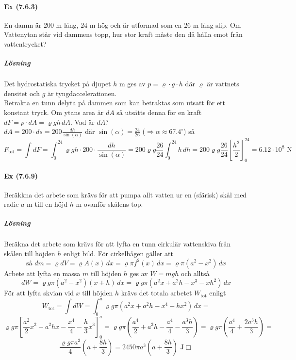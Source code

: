 \paragraph*{Ex (7.6.3)} En damm är $200$ m lång, $24$ m hög och är utformad som en $26$ m lång slip.
Om Vattenytan står vid dammens topp, hur stor kraft måste den då hålla emot från vattentrycket?
\subparagraph{Lösning}
Det hydrostatiska trycket på djupet $h$ m ges av $p=\varrho\cdot g\cdot h$ där $\varrho$ är vattnets densitet och $g$ är tyngdaccelerationen.\\
Betrakta en tunn delyta på dammen som kan betraktas som utsatt för ett konstant tryck.
Om ytans area är $dA$ så utsätts denna för en kraft $dF=p\cdot dA=\varrho g h\, dA$.
Vad är $dA$?\\
$dA=200\cdot ds=200\frac{dh}{\sin(\alpha)}$ där $\sin(\alpha)=\frac{24}{26}$ ($\Rightarrow\alpha\approx 67.4^\circ$) så
\begin{equation*}
    F_{\text{tot}}=
    \int dF=
    \int_0^24\varrho g h \cdot 200 \cdot\frac{dh}{\sin(\alpha)}=
    200\varrho g\frac{26}{24}\int_0^24h\, dh=
    200\varrho g\frac{26}{24}[\frac{h^2}{2}]_0^24=
    6.12\cdot10^8 \text{ N}
\end{equation*}

\paragraph{Ex (7.6.9)} Beräkkna det arbete som krävs för att pumpa allt vatten ur en (sfärisk) skål med radie $a$ m till en höjd $h$ m ovanför skålens top.
\subparagraph{Lösning}
Beräkna det arbete som krävs för att lyfta en tunn cirkulär vattenskiva från skålen till höjden $h$ enligt bild.
För cirkelbågen gäller att
\begin{equation*}
    \text{så }dm=
    \varrho dV=
    \varrho A(x)\, dx=
    \varrho\pi f^2(x)\, dx=
    \varrho\pi(a^2-x^2)\, dx
\end{equation*}
Arbete att lyfta en massa $m$ till höjden $h$  ges av $W=mgh$ och alltså
\begin{equation*}
    dW=
    \varrho g\pi(a^2-x^2)(x+h)\, dx=
    \varrho g\pi(a^2x+a^2h-x^3-xh^2)\, dx
\end{equation*}
För att lyfta skvian vid $x$ till höjden $h$ krävs det totala arbetet $W_{\text{tot}}$ enligt
\begin{equation*}
    W_{\text{tot}}=
    \int dW=
    \int_0^a\varrho g\pi(a^2x+a^2h-x^4-hx^2)\, dx=
\end{equation*}
\begin{equation*}
    \varrho g\pi[\frac{a^2}{2}x^2+a^2hx-\frac{x^4}{4}-\frac{h}{3}x^3]_0^a=
    \varrho g\pi(\frac{a^4}{2}+a^3h-\frac{a^4}{4}-\frac{a^3h}{3})=
    \varrho g\pi(\frac{a^4}{4}+\frac{2a^3h}{3})=
\end{equation*}
\begin{equation*}
    \frac{\varrho g\pi a^3}{4}(a+\frac{8h}{3})=
    2450\pi a^3(a+\frac{8h}{3})\text{ J}\Box
\end{equation*}